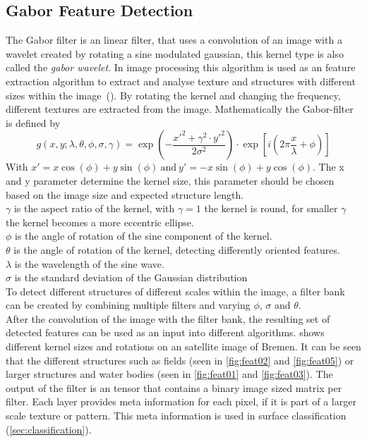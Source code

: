 \documentclass[a4paper, english]{article}
\begin{document}
    \subsection{Gabor Feature Detection}\label{sec:gabor}
    The Gabor filter is an linear filter, that uses a convolution of an image with a wavelet created by rotating a sine modulated gaussian, this kernel type is also called the \textit{gabor wavelet}. 
    In image processing this algorithm is used as an feature extraction algorithm to extract and analyse texture and structures with different sizes within the image~(\cite{Cerdan1993}). 
    By rotating the kernel and changing the frequency, different textures are extracted from the image.
%
    Mathematically the Gabor-filter is defined by
    \begin{equation}
      g(x,y; \lambda, \theta, \phi, \sigma, \gamma) = \exp \left(- \frac{x'^2 + \gamma^2\cdot y'^2}{2\sigma^2}\right) \cdot \exp \left[i \left(2\pi\frac{x}{\lambda} + \phi \right)\right] 
    \end{equation}
    With $ x' = x \cos(\phi) + y \sin(\phi)~\text{and}~y' = -x \sin(\phi) + y \cos(\phi)$.
%
    The x and y parameter determine the kernel size, this parameter should be chosen based on the image size and expected structure length.\\
    $\gamma$ is the aspect ratio of the kernel, with $\gamma = 1$ the kernel is round, for smaller $\gamma$ the kernel becomes a more eccentric ellipse.\\
    $\phi$ is the angle of rotation of the sine component of the kernel. \\
    $\theta$ is the angle of rotation of the kernel, detecting differently oriented features.\\
    $\lambda$ is the wavelength of the sine wave. \\
    $\sigma$ is the standard deviation of the Gaussian distribution\\ 

    
%
    To detect different structures of different scales within the image, a filter bank can be created by combining multiple filters and varying $\phi$, $\sigma$ and $\theta$.\\
%
    After the convolution of the image with the filter bank, the resulting set of detected features can be used as an input into different algorithms.
     shows different kernel sizes and rotations on an satellite image of Bremen. 
    It can be seen that the different structures such as fields (seen in \cref{fig:feat02} and \cref{fig:feat05}) or larger structures and water bodies (seen in \cref{fig:feat01} and \cref{fig:feat03}).
    The output of the filter is an tensor that contains a binary image sized matrix per filter. Each layer provides meta information for each pixel, if it is part of a larger scale texture or pattern. 
    This meta information is used in surface classification (\cref{sec:classification}).
\end{document}
